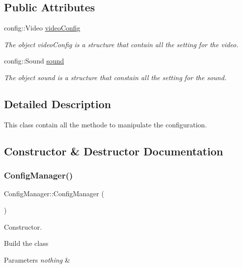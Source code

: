 \subsection*{Public Attributes}
\begin{DoxyCompactItemize}
\item 
config\+::\+Video \hyperlink{classConfigManager_a1e0dbb8563b71871e6c68abce5620cd0}{video\+Config}
\begin{DoxyCompactList}\small\item\em The object video\+Config is a structure that contain all the setting for the video. \end{DoxyCompactList}\item 
config\+::\+Sound \hyperlink{classConfigManager_a010e2da02ebc90d7ce930d1c57a79e96}{sound}
\begin{DoxyCompactList}\small\item\em The object sound is a structure that constain all the setting for the sound. \end{DoxyCompactList}\end{DoxyCompactItemize}


\subsection{Detailed Description}
This class contain all the methode to manipulate the configuration. 

\subsection{Constructor \& Destructor Documentation}
\mbox{\label{classConfigManager_a7d3d7c10423d969f7544509f6fcca32f}} 
\subsubsection{\texorpdfstring{Config\+Manager()}{ConfigManager()}}
{\footnotesize\ttfamily Config\+Manager\+::\+Config\+Manager (\begin{DoxyParamCaption}{ }\end{DoxyParamCaption})}



Constructor. 

Build the class


\begin{DoxyParams}{Parameters}
{\em nothing} & \\
\hline
\end{DoxyParams}


